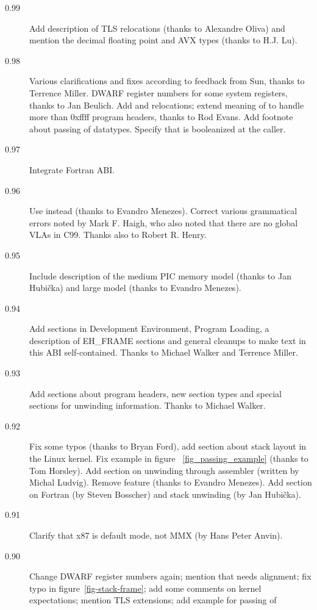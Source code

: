 \documentclass[12pt]{report}
\begin{document}
\begin{description}


\item[0.99] Add description of TLS relocations (thanks to Alexandre
  Oliva) and mention the decimal floating point and AVX types (thanks to
  H.J. Lu).
\item[0.98] Various clarifications and fixes according to feedback
  from Sun, thanks to Terrence Miller.  DWARF register numbers for some
  system registers, thanks to Jan Beulich.  Add  and
   relocations; extend meaning of 
  to handle more than 0xffff program headers, thanks to Rod Evans.
  Add footnote about passing of  datatypes. 
  Specify that  is booleanized at the caller.
\item[0.97] Integrate Fortran ABI.
\item[0.96] Use  instead 
  (thanks to Evandro Menezes).  Correct various grammatical errors
  noted by Mark F. Haigh, who also noted that there are no global VLAs
  in C99.  Thanks also to Robert R. Henry.
\item[0.95] Include description of the medium PIC memory model (thanks
  to Jan Hubi\v{c}ka) and large model (thanks to Evandro Menezes).
\item[0.94] Add sections in Development Environment, Program Loading,
  a description of EH_FRAME sections and general cleanups to make
  text in this ABI self-contained.  Thanks to Michael Walker and Terrence
  Miller.
\item[0.93] Add sections about program headers, new section types and
  special sections for unwinding information.  Thanks to Michael
  Walker.
\item[0.92] Fix some typos (thanks to Bryan Ford), add section about
  stack layout in the Linux kernel.  Fix example in figure~
  \ref{fig_passing_example} (thanks to Tom Horsley).  Add section on
  unwinding through assembler (written by Michal Ludvig).  Remove
   feature (thanks to Evandro Menezes).  Add section on
  Fortran (by Steven Bosscher) and stack unwinding (by Jan
  Hubi\v{c}ka).
\item[0.91] Clarify that x87 is default mode, not MMX (by Hans Peter
  Anvin).
\item[0.90]
  Change DWARF register
  numbers again; mention that  needs alignment; fix typo
  in figure~\ref{fig-stack-frame}; add some comments on kernel
  expectations; mention TLS extensions; add example for passing of

\end{description}
\end{document}
